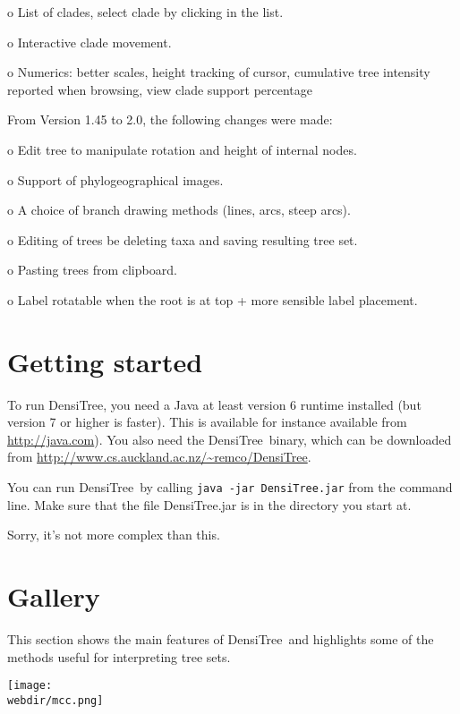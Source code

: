 \documentclass{article}
\def\DensiTree{DensiTree}
\def\webdir{/Users/remco/research/DensiTree/web}
\begin{document}
o List of clades, select clade by clicking in the list.

o Interactive clade movement.

o Numerics: better scales, height tracking of cursor, cumulative tree intensity reported when browsing, view clade support percentage

\noindent From Version 1.45 to 2.0, the following changes were made:

o Edit tree to manipulate rotation and height of internal nodes.

o Support of phylogeographical images.

o A choice of branch drawing methods (lines, arcs, steep arcs).

o Editing of trees be deleting taxa and saving resulting tree set.

o Pasting trees from clipboard.

o Label rotatable when the root is at top + more sensible label placement.

\newpage
\section{Getting started\label{sec.start}}

To run \DensiTree, you need a Java at least version 6 runtime installed (but version 7 or higher is faster). This is available for instance available from \url{http://java.com}). You also need the \DensiTree\ binary,
which can be downloaded from \url{http://www.cs.auckland.ac.nz/~remco/DensiTree}.

You can run \DensiTree\ by calling {\tt java -jar DensiTree.jar} from the command line. Make sure that the file DensiTree.jar is in the directory you start at.

Sorry, it's not more complex than this.

\newpage
\section{Gallery\label{sec.gal}}

This section shows the main features of \DensiTree\ and highlights some of the
methods useful for interpreting tree sets.

\begin{center}
\texttt{[image: \\webdir/mcc.png]}
\end{center}
\end{document}
